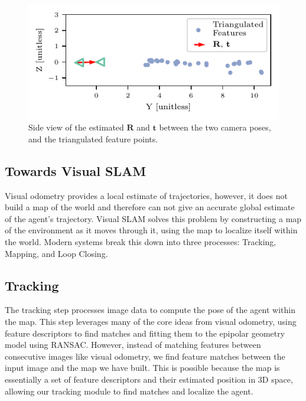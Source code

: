 \begin{figure}[h]
    \centering
    \begin{minipage}[t]{0.6\textwidth}
        \centering
        \includegraphics[width=\textwidth]{figures/3d_reconstruction.pdf}
        \caption{Side view of the estimated $\mathbf{R}$ and $\mathbf{t}$ between the two camera poses, and the triangulated feature points.}
        \label{fig:vo-3d-reconstruction}
    \end{minipage}%
\end{figure}

\subsection{Towards Visual SLAM}
\label{sec:towards-visual-slam}
Visual odometry provides a local estimate of trajectories, however, it does not build a map of the world and therefore can not give an accurate global estimate of the agent's trajectory. Visual SLAM solves this problem by constructing a map of the environment as it moves through it, using the map to localize itself within the world. Modern systems break this down into three processes: Tracking, Mapping, and Loop Closing.

\subsection{Tracking}
\label{sec:visual-slam-tracking}
The tracking step processes image data to compute the pose of the agent within the map. This step leverages many of the core ideas from visual odometry, using feature descriptors to find matches and fitting them to the epipolar geometry model using RANSAC. However, instead of matching features between consecutive images like visual odometry, we find feature matches between the input image and the map we have built. This is possible because the map is essentially a set of feature descriptors and their estimated position in 3D space, allowing our tracking module to find matches and localize the agent.

